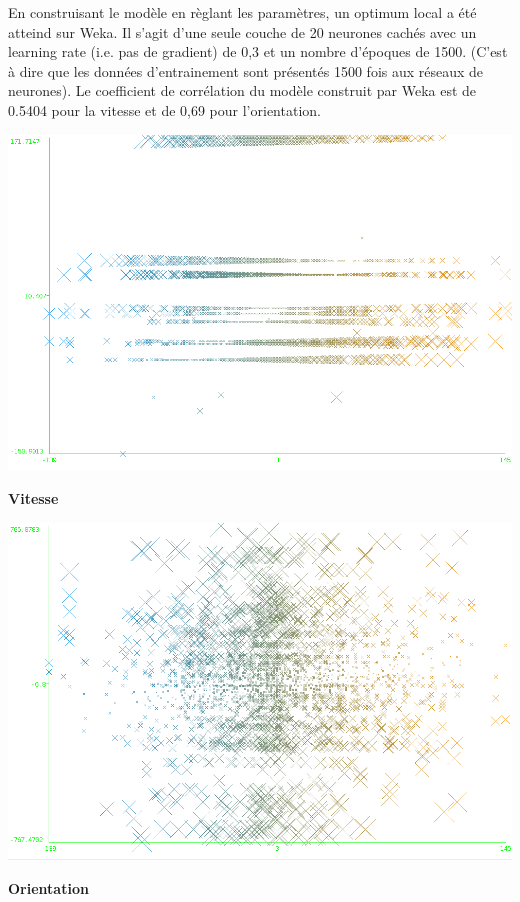 En construisant le modèle en règlant les paramètres, un optimum local a été atteind sur Weka. Il s'agit d'une seule couche de 20 neurones cachés avec un learning rate (i.e. pas de gradient) de 0,3 et un nombre d'époques de 1500.
(C'est à dire que les données d'entrainement sont présentés 1500 fois aux réseaux de neurones).
Le coefficient de corrélation du modèle construit par Weka est de 0.5404 pour la vitesse et de 0,69 pour l'orientation.

\begin{minipage}[c]{\mpwekawidth}
 \includegraphics[width=\textwidth]{../figures/121314SpeedOutputNotNormalized.png}
 \begin{center}
  \textbf{Vitesse}
 \end{center}
\end{minipage}
\begin{minipage}[c]{\mpwekawidth}
 \includegraphics[width=\textwidth]{../figures/HeadNotNormalized.png}
 \begin{center}
  \textbf{Orientation}
 \end{center}
\end{minipage}
\\


